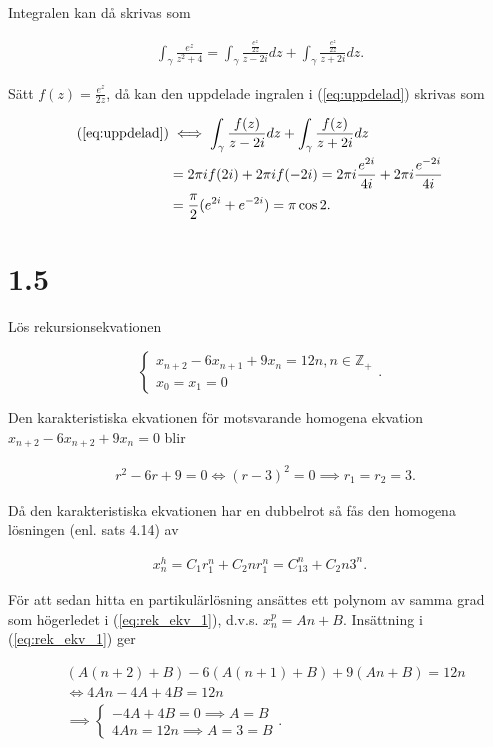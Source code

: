 \documentclass[a4paper]{article}
\begin{document}
Integralen kan då skrivas som

\begin{align}
	\int_\gamma \frac{e^z}{z^2 + 4} = \int_\gamma \frac{\frac{e^z}{2z}}{z-2i}dz + \int_\gamma \frac{\frac{e^z}{2z}}{z+2i}dz.\label{eq:uppdelad}
\end{align}

Sätt $f(z) = \frac{e^z}{2z}$, då kan den uppdelade ingralen i (\ref{eq:uppdelad}) skrivas som

\begin{align*}
	(\ref{eq:uppdelad}) &\iff \int_\gamma \frac{f(z)}{z-2i}dz + \int_\gamma \frac{f(z)}{z+2i}dz\\
		&= 2\pi i f(2i) + 2\pi i f(-2i) = 2\pi i \frac{e^{2i}}{4i} + 2\pi i \frac{e^{-2i}}{4i}\\
		&= \frac{\pi}{2}(e^{2i} + e^{-2i}) = \pi\cos 2.
\end{align*}

\section*{1.5}

Lös rekursionsekvationen

\begin{equation}
	\begin{cases}
		x_{n+2} - 6x_{n+1} + 9x_n = 12n, n \in \mathbb{Z}_+\\
		x_0 = x_1 = 0
	\end{cases}\label{eq:rek_ekv_1}.
\end{equation}

Den karakteristiska ekvationen för motsvarande homogena ekvation $x_{n+2} - 6x_{n+2} + 9x_n = 0$ blir

\begin{align*}
	&r^2 - 6r + 9 = 0 \iff (r - 3)^2 = 0 \implies r_1 = r_2 = 3.
\end{align*}

Då den karakteristiska ekvationen har en dubbelrot så fås den homogena lösningen (enl. sats 4.14) av

\begin{align*}
	x_n^h = C_1r_1^n + C_2nr_1^n = C_13^n + C_2n3^n.
\end{align*}

För att sedan hitta en partikulärlösning ansättes ett polynom av samma grad som högerledet i (\ref{eq:rek_ekv_1}), d.v.s. $x_n^p = An + B$. Insättning i (\ref{eq:rek_ekv_1}) ger

\begin{align*}
	&(A(n+2) + B) - 6(A(n+1) + B) + 9(An + B) = 12n\\
	&\iff 4An - 4A + 4B = 12n\\
	&\implies	\begin{cases}
					-4A + 4B = 0 \implies A = B\\
					4An = 12n \implies A = 3 = B
				\end{cases}.
\end{align*}
\end{document}
